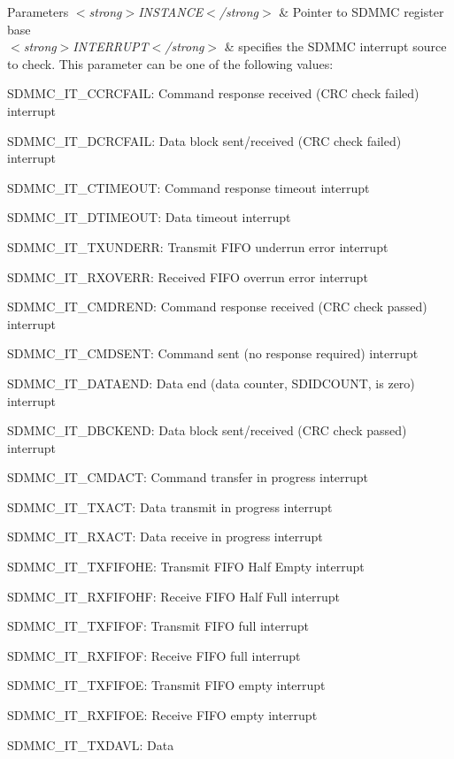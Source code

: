 \begin{DoxyParams}{Parameters}
{\em $<$strong$>$\+I\+N\+S\+T\+A\+N\+C\+E$<$/strong$>$} & Pointer to S\+D\+M\+MC register base\\
\hline
{\em $<$strong$>$\+I\+N\+T\+E\+R\+R\+U\+P\+T$<$/strong$>$} & specifies the S\+D\+M\+MC interrupt source to check. This parameter can be one of the following values\+: \begin{DoxyItemize}
\item S\+D\+M\+M\+C\+\_\+\+I\+T\+\_\+\+C\+C\+R\+C\+F\+A\+IL\+: Command response received (C\+RC check failed) interrupt \item S\+D\+M\+M\+C\+\_\+\+I\+T\+\_\+\+D\+C\+R\+C\+F\+A\+IL\+: Data block sent/received (C\+RC check failed) interrupt \item S\+D\+M\+M\+C\+\_\+\+I\+T\+\_\+\+C\+T\+I\+M\+E\+O\+UT\+: Command response timeout interrupt \item S\+D\+M\+M\+C\+\_\+\+I\+T\+\_\+\+D\+T\+I\+M\+E\+O\+UT\+: Data timeout interrupt \item S\+D\+M\+M\+C\+\_\+\+I\+T\+\_\+\+T\+X\+U\+N\+D\+E\+RR\+: Transmit F\+I\+FO underrun error interrupt \item S\+D\+M\+M\+C\+\_\+\+I\+T\+\_\+\+R\+X\+O\+V\+E\+RR\+: Received F\+I\+FO overrun error interrupt \item S\+D\+M\+M\+C\+\_\+\+I\+T\+\_\+\+C\+M\+D\+R\+E\+ND\+: Command response received (C\+RC check passed) interrupt \item S\+D\+M\+M\+C\+\_\+\+I\+T\+\_\+\+C\+M\+D\+S\+E\+NT\+: Command sent (no response required) interrupt \item S\+D\+M\+M\+C\+\_\+\+I\+T\+\_\+\+D\+A\+T\+A\+E\+ND\+: Data end (data counter, S\+D\+I\+D\+C\+O\+U\+NT, is zero) interrupt \item S\+D\+M\+M\+C\+\_\+\+I\+T\+\_\+\+D\+B\+C\+K\+E\+ND\+: Data block sent/received (C\+RC check passed) interrupt \item S\+D\+M\+M\+C\+\_\+\+I\+T\+\_\+\+C\+M\+D\+A\+CT\+: Command transfer in progress interrupt \item S\+D\+M\+M\+C\+\_\+\+I\+T\+\_\+\+T\+X\+A\+CT\+: Data transmit in progress interrupt \item S\+D\+M\+M\+C\+\_\+\+I\+T\+\_\+\+R\+X\+A\+CT\+: Data receive in progress interrupt \item S\+D\+M\+M\+C\+\_\+\+I\+T\+\_\+\+T\+X\+F\+I\+F\+O\+HE\+: Transmit F\+I\+FO Half Empty interrupt \item S\+D\+M\+M\+C\+\_\+\+I\+T\+\_\+\+R\+X\+F\+I\+F\+O\+HF\+: Receive F\+I\+FO Half Full interrupt \item S\+D\+M\+M\+C\+\_\+\+I\+T\+\_\+\+T\+X\+F\+I\+F\+OF\+: Transmit F\+I\+FO full interrupt \item S\+D\+M\+M\+C\+\_\+\+I\+T\+\_\+\+R\+X\+F\+I\+F\+OF\+: Receive F\+I\+FO full interrupt \item S\+D\+M\+M\+C\+\_\+\+I\+T\+\_\+\+T\+X\+F\+I\+F\+OE\+: Transmit F\+I\+FO empty interrupt \item S\+D\+M\+M\+C\+\_\+\+I\+T\+\_\+\+R\+X\+F\+I\+F\+OE\+: Receive F\+I\+FO empty interrupt \item S\+D\+M\+M\+C\+\_\+\+I\+T\+\_\+\+T\+X\+D\+A\+VL\+: Data 
\end{DoxyItemize}
\end{DoxyParams}
